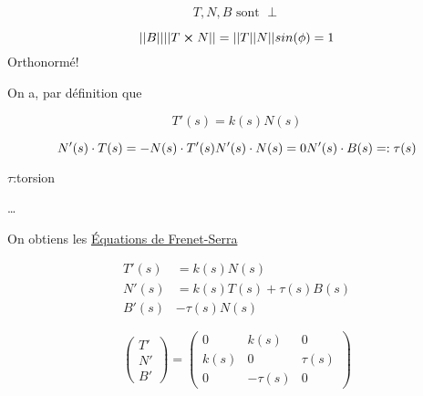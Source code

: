 \documentclass{article}
\begin{document}
$$T,N,B \text{ sont } \perp$$

$$||B|| ||T\cross N|| = ||T||N||sin(\phi) =1$$
Orthonormé!

On a, par définition que

$$T'(s) = k(s)N(s)$$

$$N'(s)\cdot T(s) =-N(s)\cdot T'(s)\\N'(s)\cdot N(s) = 0 \\ N'(s)\cdot B(s) =:\tau(s)$$

$\tau$:torsion

\dots

On obtiens les \underline{Équations de Frenet-Serra}

\begin{align*}
	T'(s) &= k(s)N(s)\\
	N'(s) &= k(s)T(s) + \tau(s)B(s)\\
	B'(s) & -\tau(s) N(s)
\end{align*}

$$\begin{pmatrix}
	T'\\N'\\B'
\end{pmatrix} = \begin{pmatrix}
	0 & k(s) & 0 \\ k(s) &0 & \tau(s) \\0 & -\tau(s) &0
\end{pmatrix}$$
\end{document}
